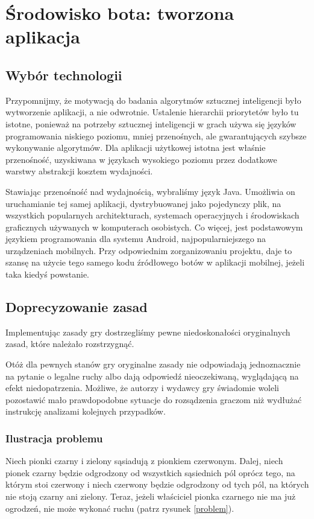 \documentclass{pracamgr}
\begin{document}
\chapter{Środowisko bota: tworzona aplikacja}

\section{Wybór technologii}

Przypomnijmy, że motywacją do badania algorytmów sztucznej inteligencji było wytworzenie aplikacji, a nie odwrotnie.
Ustalenie hierarchii priorytetów było tu istotne, ponieważ na potrzeby sztucznej inteligencji w grach używa się języków programowania niskiego poziomu, mniej przenośnych, ale gwarantujących szybsze wykonywanie algorytmów.
Dla aplikacji użytkowej istotna jest właśnie przenośność, uzyskiwana w językach wysokiego poziomu przez dodatkowe warstwy abstrakcji kosztem wydajności.

Stawiając przenośność nad wydajnością, wybraliśmy język Java.
Umożliwia on uruchamianie tej samej aplikacji, dystrybuowanej jako pojedynczy plik, na wszystkich popularnych architekturach, systemach operacyjnych i środowiskach graficznych używanych w komputerach osobistych.
Co więcej, jest podstawowym językiem programowania dla systemu Android, najpopularniejszego na urządzeniach mobilnych.
Przy odpowiednim zorganizowaniu projektu, daje to szansę na użycie tego samego kodu źródłowego botów w aplikacji mobilnej, jeżeli taka kiedyś powstanie.

\section{Doprecyzowanie zasad}

Implementując zasady gry dostrzegliśmy pewne niedoskonałości oryginalnych zasad, które należało rozstrzygnąć.

Otóż dla pewnych stanów gry oryginalne zasady nie odpowiadają jednoznacznie na pytanie o legalne ruchy albo dają odpowiedź nieoczekiwaną, wyglądającą na efekt niedopatrzenia.
Możliwe, że autorzy i wydawcy gry świadomie woleli pozostawić mało prawdopodobne sytuacje do rozsądzenia graczom niż wydłużać instrukcję analizami kolejnych przypadków.

\subsection{Ilustracja problemu}

Niech pionki czarny i zielony sąsiadują z pionkiem czerwonym. Dalej, niech pionek czarny będzie odgrodzony od wszystkich sąsiednich pól oprócz tego, na którym stoi czerwony i niech czerwony będzie odgrodzony od tych pól, na których nie stoją czarny ani zielony. Teraz, jeżeli właściciel pionka czarnego nie ma już ogrodzeń, nie może wykonać ruchu (patrz rysunek \ref{problem}).
\end{document}
